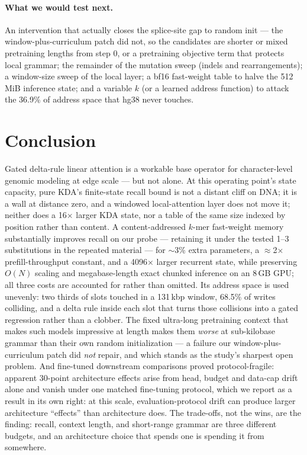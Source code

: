 \documentclass[11pt]{article}
\theoremstyle{plain}
\begin{document}
\paragraph{What we would test next.} An intervention that actually closes the splice-site gap to
random init --- the window-plus-curriculum patch did not, so the candidates are shorter or mixed
pretraining lengths from step 0, or a pretraining objective term that protects local grammar;
the remainder of the mutation
sweep (indels and rearrangements); a window-size sweep of the local layer; a bf16 fast-weight table to halve
the 512\,MiB inference state; and a variable $k$ (or a learned address function) to attack the
36.9\% of address space that hg38 never touches.

\section{Conclusion}\label{sec:conc}

Gated delta-rule linear attention is a workable base operator for character-level genomic modeling
at edge scale --- but not alone. At this operating point's state capacity, pure KDA's
finite-state recall bound is not a distant cliff on DNA; it is a wall at distance zero, and a
windowed local-attention layer does not move it; neither does a 16$\times$ larger KDA state, nor a
table of the same size indexed by position rather than content. A
content-addressed $k$-mer fast-weight memory substantially improves recall on our probe ---
retaining it under the tested 1--3 substitutions in the repeated material --- for $\sim$3\% extra parameters, a $\approx$2$\times$
prefill-throughput constant, and a 4096$\times$ larger recurrent state, while preserving $O(N)$
scaling and megabase-length exact chunked inference on an 8\,GB GPU; all three costs are
accounted for rather than omitted. Its address space is used
unevenly: two thirds of slots touched in a 131\,kbp window, 68.5\% of writes colliding, and a
delta rule inside each slot that turns those collisions into a gated regression rather than a
clobber. The fixed ultra-long pretraining context that makes such models impressive at length
makes them \emph{worse} at sub-kilobase grammar than their own random initialization --- a
failure our window-plus-curriculum patch did \emph{not} repair, and which stands as the study's
sharpest open problem. And fine-tuned downstream comparisons proved protocol-fragile: apparent
30-point architecture effects arise from head, budget and data-cap drift alone and vanish under
one matched fine-tuning protocol, which we report as a result in its own right: at this scale,
evaluation-protocol drift can produce larger architecture ``effects'' than architecture does.
The trade-offs, not the wins, are the finding: recall, context length, and short-range grammar
are three different budgets, and an architecture choice that spends one is spending it from
somewhere.
\end{document}
